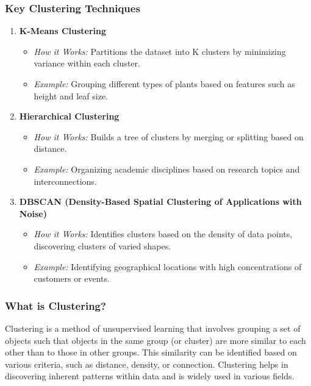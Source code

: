 \documentclass[aspectratio=169]{beamer}
\begin{document}
\begin{frame}[fragile]
    \frametitle{Key Clustering Techniques}
    \begin{enumerate}
        \item \textbf{K-Means Clustering}
        \begin{itemize}
            \item \textit{How it Works:} Partitions the dataset into K clusters by minimizing variance within each cluster.
            \item \textit{Example:} Grouping different types of plants based on features such as height and leaf size.
        \end{itemize}

        \item \textbf{Hierarchical Clustering}
        \begin{itemize}
            \item \textit{How it Works:} Builds a tree of clusters by merging or splitting based on distance.
            \item \textit{Example:} Organizing academic disciplines based on research topics and interconnections.
        \end{itemize}

        \item \textbf{DBSCAN (Density-Based Spatial Clustering of Applications with Noise)}
        \begin{itemize}
            \item \textit{How it Works:} Identifies clusters based on the density of data points, discovering clusters of varied shapes.
            \item \textit{Example:} Identifying geographical locations with high concentrations of customers or events.
        \end{itemize}
    \end{enumerate}
\end{frame}

\begin{frame}[fragile]
    \frametitle{What is Clustering?}
    Clustering is a method of unsupervised learning that involves grouping a set of objects such that objects in the same group (or cluster) are more similar to each other than to those in other groups. This similarity can be identified based on various criteria, such as distance, density, or connection. Clustering helps in discovering inherent patterns within data and is widely used in various fields.
\end{frame}
\end{document}
